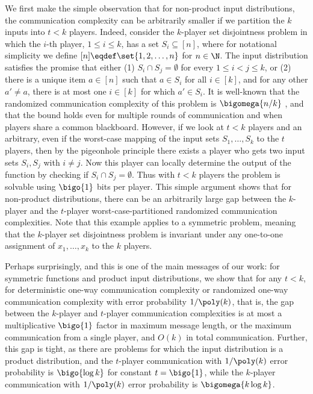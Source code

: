 We first make the simple observation that for non-product input distributions, the communication complexity can be arbitrarily smaller if we partition the $k$ inputs into $t < k$ players. 
Indeed, consider the $k$-player set disjointness problem in which the $i$-th player, $1 \leq i \leq k$, has a set $S_i \subseteq [n]$, 
where for notational simplicity we define $[n]\eqdef \set{1,2,\dots, n}$ for $n\in \N$. 
The input distribution satisfies the promise that either (1) $S_i \cap S_j = \emptyset$ for every $1\le i < j \le k$, or (2) there is a unique item $a \in [n]$ such that $a \in S_i$ for all $i \in [k]$, and for any other $a' \neq a$, there is at most one $i \in [k]$ for which $a' \in S_i$. It is well-known that the randomized communication complexity of this problem is $\bigomega{n/k}$ \cite{BarYossef:2004eya,g09,jayram2009hellinger}, and that the bound holds even for multiple rounds of communication and when players share a common blackboard. 
However, if we look at $t < k$ players and an arbitrary, even if the worst-case mapping of the input sets $S_1, \ldots, S_k$ to the $t$ players, then by the pigeonhole principle there exists a player who gets two input sets $S_i, S_j$ with $i \ne j$. 
Now this player can locally determine the output of the function by checking if $S_i \cap S_j=\emptyset$. 
Thus with $t < k$ players the problem is solvable using $\bigo{1}$ bits per player. This simple argument shows that for non-product distributions, there can be an arbitrarily large gap between the $k$-player and the $t$-player worst-case-partitioned randomized communication complexities. 
Note that this example applies to a symmetric problem, meaning that the $k$-player set disjointness problem is invariant under any one-to-one assignment of $x_1, \ldots, x_k$ to the $k$ players.

Perhaps surprisingly, and this is one of the main messages of our work: for symmetric functions and product input distributions, we show that for any $t < k$, for deterministic one-way communication complexity or randomized one-way communication complexity with error probability $1/\poly(k)$, that is, the gap between the $k$-player and $t$-player communication complexities is at most a multiplicative $\bigo{1}$ factor in maximum message length, or the maximum communication from a single player, and $O(k)$ in total communication. Further, this gap is tight, as there are problems for which the input distribution is a product distribution, and the $t$-player communication with $1/\poly(k)$ error probability is $\bigo{\log k}$ for constant $t=\bigo{1}$, while the $k$-player communication with $1/\poly(k)$ error probability is $\bigomega{k \log k}$. 

